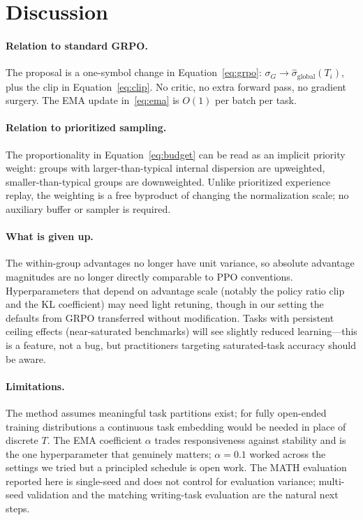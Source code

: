 \documentclass[10pt]{article}
\begin{document}
\section{Discussion}

\paragraph{Relation to standard GRPO.}
The proposal is a one-symbol change in Equation~\eqref{eq:grpo}: $\sigma_G
\rightarrow \hat{\sigma}_{\text{global}}(T_i)$, plus the clip in
Equation~\eqref{eq:clip}. No critic, no extra forward pass, no gradient surgery.
The EMA update in~\eqref{eq:ema} is $O(1)$ per batch per task.

\paragraph{Relation to prioritized sampling.}
The proportionality in Equation~\eqref{eq:budget} can be read as an implicit
priority weight: groups with larger-than-typical internal dispersion are
upweighted, smaller-than-typical groups are downweighted. Unlike prioritized
experience replay, the weighting is a free byproduct of changing the
normalization scale; no auxiliary buffer or sampler is required.

\paragraph{What is given up.}
The within-group advantages no longer have unit variance, so absolute advantage
magnitudes are no longer directly comparable to PPO conventions. Hyperparameters
that depend on advantage scale (notably the policy ratio clip and the KL
coefficient) may need light retuning, though in our setting the defaults from
GRPO transferred without modification. Tasks with persistent ceiling effects
(near-saturated benchmarks) will see slightly reduced learning---this is a
feature, not a bug, but practitioners targeting saturated-task accuracy should
be aware.

\paragraph{Limitations.}
The method assumes meaningful task partitions exist; for fully open-ended
training distributions a continuous task embedding would be needed in place of
discrete $T$. The EMA coefficient $\alpha$ trades responsiveness against
stability and is the one hyperparameter that genuinely matters; $\alpha=0.1$
worked across the settings we tried but a principled schedule is open work.
The MATH evaluation reported here is single-seed and does not control for
evaluation variance; multi-seed validation and the matching writing-task
evaluation are the natural next steps.
\end{document}
